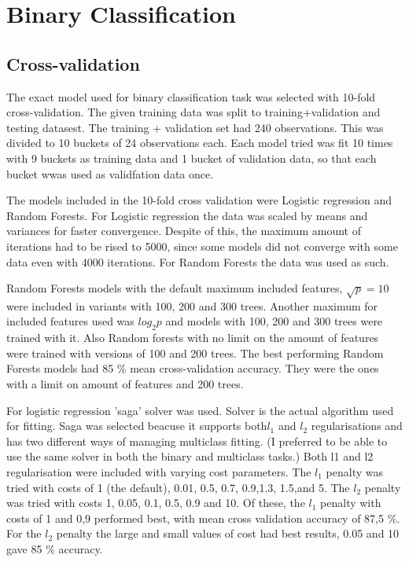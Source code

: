 \documentclass[a4size, 12pt]{report}
\begin{document}
	
	\section*{Binary Classification}
	
	\subsection*{Cross-validation}
	
	The exact model used for binary classification task was selected with 10-fold cross-validation. The given training data was split to training+validation and testing datasest. The training + validation set had 240 observations. This was divided to 10 buckets of 24 observations each. Each model tried was fit 10 times with 9 buckets as training data and 1 bucket of validation data, so that each bucket wwas used as validfation data once.  
	
	The models included in the 10-fold cross validation were Logistic regression and Random Forests. For Logistic regression the data was scaled by means and variances for faster convergence. Despite of this, the maximum amount of iterations had to be rised to 5000, since some models did not converge with some data even with 4000 iterations.  For Random Forests the data was used as such. 
	
		Random Forests models with the default maximum included features, $\sqrt{p}=10$ were included in variants with 100, 200 and 300 trees. Another maximum for included features used was $log_2 p$ and models with 100, 200 and 300 trees were trained with it. Also Random forests with no limit on the amount of features were trained with versions of 100 and 200 trees. The best performing Random Forests models had 85 \% mean cross-validation accuracy. They were the ones with a limit on amount of features and 200 trees.  
	
		For logistic regression 'saga' solver was used. Solver is the actual algorithm used for fitting. Saga was selected beacuse it supports both$l_1$ and $l_2$ regularisations and has two different ways of managing multiclass fitting. (I preferred to be able to use the same solver in both the binary and multiclass tasks.) Both l1 and l2 regularisation were included with varying cost parameters. The $l_1$ penalty was tried with costs of 1 (the default), 0.01, 0.5,  0.7, 0.9,1.3,  1.5,and 5. The $l_2$ penalty was tried with costs 1, 0.05,  0.1, 0.5, 0.9 and 10. 
		Of these, the $l_1$ penalty with costs of 1 and 0,9 performed best, with mean cross validation accuracy of 87,5 \%. For the $l_2$ penalty the large and small values of cost had best results, 0.05 and 10 gave 85 \% accuracy.		
  
\end{document}
